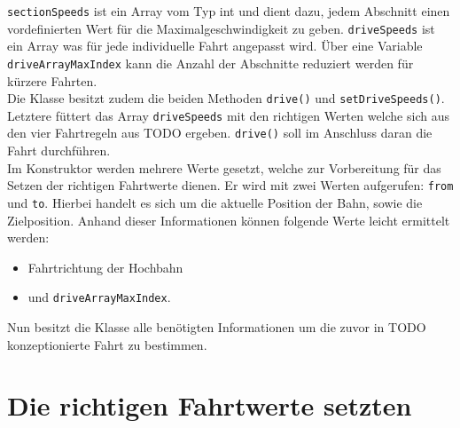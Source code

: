 \texttt{sectionSpeeds} ist ein Array vom Typ int und dient dazu, jedem Abschnitt einen vordefinierten Wert für die Maximalgeschwindigkeit zu geben. \texttt{driveSpeeds} ist ein Array was für jede individuelle Fahrt angepasst wird. Über eine Variable \texttt{driveArrayMaxIndex} kann die Anzahl der Abschnitte reduziert werden für kürzere Fahrten. \\
Die Klasse besitzt zudem die beiden Methoden \texttt{drive()} und \texttt{setDriveSpeeds()}. Letztere füttert das Array \texttt{driveSpeeds} mit den richtigen Werten welche sich aus den vier Fahrtregeln aus TODO ergeben. \texttt{drive()} soll im Anschluss daran die Fahrt durchführen. \\
Im Konstruktor werden mehrere Werte gesetzt, welche zur Vorbereitung für das Setzen der richtigen Fahrtwerte dienen. Er wird mit zwei Werten aufgerufen: \texttt{from} und \texttt{to}. Hierbei handelt es sich um die aktuelle Position der Bahn, sowie die Zielposition. Anhand dieser Informationen können folgende Werte leicht ermittelt werden:

\begin{itemize}
	\item Fahrtrichtung der Hochbahn
	\item und \texttt{driveArrayMaxIndex}.
\end{itemize}

Nun besitzt die Klasse alle benötigten Informationen um die zuvor in TODO konzeptionierte Fahrt zu bestimmen.

\section{Die richtigen Fahrtwerte setzten}

